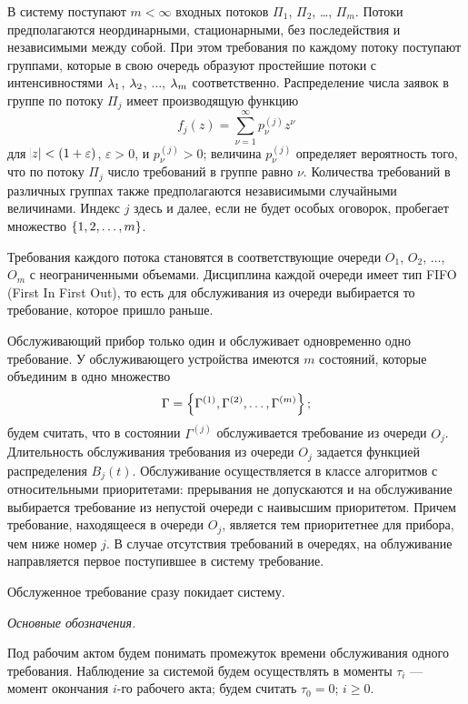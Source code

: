 \documentclass[a4paper,14pt,russian]{article}
\begin{document}
В систему поступают $m<\infty$ входных потоков $\Pi_1$, $\Pi_2$, \ldots, $\Pi_m$. Потоки предполагаются неординарными, стационарными, без последействия и независимыми между собой. При этом требования по каждому потоку поступают группами, которые в свою очередь образуют простейшие потоки с интенсивностями $\lambda_1$, $\lambda_2$, $\ldots$, $\lambda_m$ соответственно. Распределение числа заявок в группе по потоку $\Pi_j$ имеет производящую функцию 
\begin{equation}
f_j(z)=\sum_{\nu=1}^{\infty}{p_{\nu}^{(j)} z^{\nu}}
\label{proizvod_func_one}
\end{equation}
для $ \abs{z} < \left(1 +\varepsilon\right)$, $\varepsilon >0$, и $p_{\nu}^{(j)} > 0$; величина $p_{\nu}^{(j)}$ определяет вероятность того, что по потоку $\Pi_j$ число требований в группе равно $\nu$.
Количества требований в различных группах также предполагаются независимыми случайными величинами. 
Индекс $j$ здесь и далее, если не будет особых оговорок, пробегает множество $\left\{1, 2, \ldots, m\right\}$.

Требования каждого потока становятся в соответствующие очереди $O_1$, $O_2$, $\ldots$, $O_m$ с неограниченными объемами. Дисциплина каждой очереди имеет тип FIFO (First In First Out), то есть для обслуживания из очереди выбирается то требование, которое пришло раньше.

Обслуживающий прибор только один и обслуживает одновременно одно требование. У обслуживающего устройства имеются $m$ состояний, которые объединим в одно множество 
$$\Gamma = \left\{\Gamma^{(1)}, \Gamma^{(2)}, \ldots, \Gamma^{(m)}\right\};$$
будем считать, что в состоянии $\Gamma^{(j)}$ обслуживается требование из очереди $O_j$. Длительность обслуживания требования из очереди $O_j$ задается функцией распределения $B_j(t)$. Обслуживание осуществляется в классе алгоритмов с относительными приоритетами: прерывания не допускаются и на обслуживание выбирается требование из непустой очереди с наивысшим приоритетом. Причем требование, находящееся в очереди $O_j$, является тем приоритетнее для прибора, чем ниже номер $j$. В случае отсутствия требований в очередях, на облуживание направляется первое поступившее в систему требование. 

Обслуженное требование сразу покидает систему.

\textit{Основные обозначения.}

Под рабочим актом будем понимать промежуток времени обслуживания одного требования. Наблюдение за системой будем осуществлять в моменты $\tau_i$ --- момент окончания $i$-го рабочего акта; будем считать $\tau_0 = 0$; $i \geqslant 0$.
\end{document}
